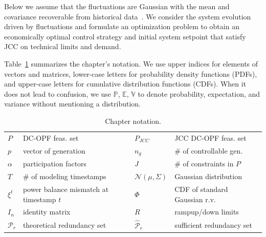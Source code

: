 Below we assume that the fluctuations are Gaussian with the mean and covariance recoverable from historical data~\cite{roald2017chance, owen2019importance}.
We consider the system evolution driven by fluctuations and formulate an optimization problem to obtain an economically optimal control strategy and initial system setpoint that satisfy JCC on technical limits and demand.

Table~\ref{tab:notation} summarizes the chapter's notation. We use upper indices for elements of vectors and matrices, lower-case letters for probability density functions (PDFs), and upper-case letters for cumulative distribution functions (CDFs). When it does not lead to confusion, we use $\mathbb{P}$, $\mathbb{E}$, $\mathbb{V}$ to denote probability, expectation, and variance without mentioning a distribution. 

\begin{table}[t]
    \centering
    \caption{Chapter notation.}
    \begin{tabular}{|p{0.35cm}|p{2.95cm}|p{0.95cm}|p{2.9cm}|}
        ${P}$ & DC-OPF feas. set & $P_{JCC}$ & JCC DC-OPF feas. set \\
        $p$ & vector of generation & $n_g$ & \# of controllable gen. \\
        $\alpha$ & participation factors & $J$ & \# of constraints in $P$ \\
        $T$ & \# of modeling timestamps & $\mathcal{N}(\mu, \Sigma)$ & Gaussian distribution \\  
        $\xi^t$  & power balance mismatch at timestamp $t$ & $\Phi$ & CDF of standard Gaussian r.v. \\
        $I_n$ & identity matrix & $R$ & rampup/down limits \\
        $\mathcal{P}_r$ & theoretical redundancy set & $\hat{\mathcal{P}}_r$ & sufficient redundancy set\\
    \end{tabular}
    \label{tab:notation}
\end{table}
